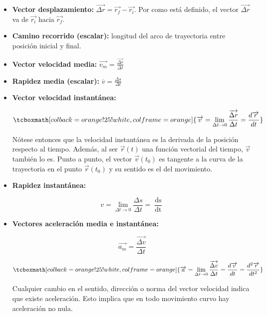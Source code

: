 \documentclass{article}
\begin{document}
\begin{itemize}
\item \textbf{Vector desplazamiento:} $\overrightarrow{ \Delta r } = \overrightarrow{r_f} - \overrightarrow{r_i}$. Por como está definido, el vector $\overrightarrow{\Delta r}$ va de $\overrightarrow{r_i}$ hacia $\overrightarrow{r_f}$.
\item \textbf{Camino recorrido (escalar):} longitud del arco de trayectoria entre posición inicial y final.
\item \textbf{Vector velocidad media:} $\overrightarrow{v_m} = \frac{\overrightarrow{\Delta r}}{\Delta t}$
\item \textbf{Rapidez media (escalar):} $\overline{v} = \frac{\Delta s}{\Delta t}$
\item \textbf{Vector velocidad instantánea:}

\begin{equation}
\tcboxmath[colback=orange!25!white,colframe=orange]{
\overrightarrow{v} = \lim_{\Delta t \rightarrow 0} \frac{ \mathop{\overrightarrow{\Delta r}} }{\Delta t} = \frac{d\overrightarrow{r}}{\mathop{dt}}
}
\end{equation}

Nótese entonces que la velocidad instantánea es la derivada de la posición respecto al tiempo. Además, al ser $\overrightarrow{r}(t)$ una función vectorial del tiempo, $\overrightarrow{v}$ también lo es. Punto a punto, el vector $\overrightarrow{v}(t_0)$ es tangente a la curva de la trayectoria en el punto $\overrightarrow{r}(t_0)$ y su sentido es el del movimiento.
\item \textbf{Rapidez instantánea:}

\begin{equation}
v = \lim_{\Delta t \rightarrow 0} \frac{\Delta s}{\Delta t} = \frac{\mathop{ds}}{\mathop{dt}}
\end{equation}

\item \textbf{Vectores aceleración media e instantánea:}

\begin{equation}
\overrightarrow{a_m} = \frac{ \overrightarrow{ \Delta v } }{ \Delta t }
\end{equation}

\begin{equation}
\tcboxmath[colback=orange!25!white,colframe=orange]{
\overrightarrow{a} = \lim_{\Delta t \rightarrow 0} \frac{ \overrightarrow{ \Delta v } }{\Delta t} = \frac{ \mathop{d\overrightarrow{v}} }{ \mathop{dt} } = \frac{ \mathop{ d^2 \overrightarrow{r} } }{ \mathop{ dt^2 } }
}
\end{equation}

Cualquier cambio en el sentido, dirección o norma del vector velocidad indica que existe aceleración. Esto implica que en todo movimiento curvo hay aceleración no nula.

\end{itemize}
\end{document}
